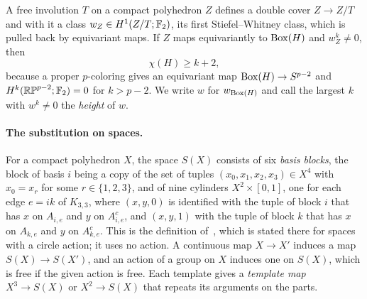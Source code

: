 A free involution $T$ on a compact polyhedron $Z$ defines a double cover $Z\to Z/T$ and with it a class $w_Z\in H^1(Z/T;\mathbb F_2)$, its first Stiefel--Whitney class, which is pulled back by equivariant maps. If $Z$ maps equivariantly to $\operatorname{Box}(H)$ and $w_Z^k\ne0$, then
\begin{equation}\label{eq:obstruction}
 \chi(H)\ge k+2 ,
\end{equation}
because a proper $p$-coloring gives an equivariant map $\operatorname{Box}(H)\to S^{p-2}$ and $H^k(\mathbb{RP}^{p-2};\mathbb F_2)=0$ for $k>p-2$. We write $w$ for $w_{\operatorname{Box}(H)}$ and call the largest $k$ with $w^k\ne0$ the \emph{height} of $w$.

\paragraph{The substitution on spaces.}
For a compact polyhedron $X$, the space $S(X)$ consists of six \emph{basis blocks}, the block of basis $i$ being a copy of the set of tuples $(x_0,x_1,x_2,x_3)\in X^4$ with $x_0=x_r$ for some $r\in\{1,2,3\}$, and of nine cylinders $X^2\times[0,1]$, one for each edge $e=ik$ of $K_{3,3}$, where $(x,y,0)$ is identified with the tuple of block $i$ that has $x$ on $A_{i,e}$ and $y$ on $A_{i,e}^c$, and $(x,y,1)$ with the tuple of block $k$ that has $x$ on $A_{k,e}$ and $y$ on $A_{k,e}^c$. This is the definition of~\cite[Section~3.3]{Z}, which is stated there for spaces with a circle action; it uses no action. A continuous map $X\to X'$ induces a map $S(X)\to S(X')$, and an action of a group on $X$ induces one on $S(X)$, which is free if the given action is free. Each template gives a \emph{template map} $X^3\to S(X)$ or $X^2\to S(X)$ that repeats its arguments on the parts.

